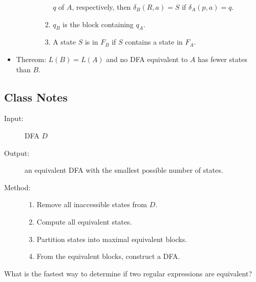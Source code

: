 \documentclass[]{article}
\begin{document}
\begin{itemize}
\begin{itemize}
\begin{enumerate}
\begin{enumerate}
                $q$ of $A$, respectively, then $\delta_B(R, a) = S$ if
                $\delta_A(p, a) = q$.
                \item $q_B$ is the block containing $q_A$.
                \item A state $S$ is in $F_B$ if $S$ contains a state in $F_A$.
              \end{enumerate}
          \end{enumerate}
      \end{itemize}
    \item Thereom: $L(B) = L(A)$ and no DFA equivalent to $A$ has fewer states
    than $B$.
  \end{itemize}
  \subsection{Class Notes}
    \begin{description}
      \item[Input:] DFA $D$
      \item[Output:] an equivalent DFA with the smallest possible number of
      states.
      \item[Method:]
        \begin{enumerate}
          \item Remove all inaccessible states from $D$.
          \item Compute all equivalent states.
          \item Partition states into maximal equivalent blocks.
          \item From the equivalent blocks, construct a DFA.
        \end{enumerate}
    \end{description}
  What is the fastest way to determine if two regular expressions are
  equivalent?
\end{document}
